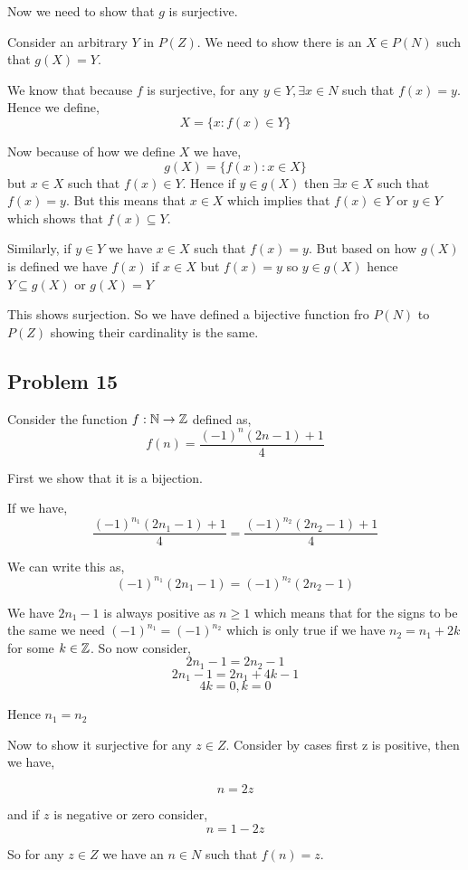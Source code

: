 \documentclass[a4paper]{report}
\begin{document}
Now we need to show that $g$ is surjective.

Consider an arbitrary $Y$ in $P(Z)$. We need to show there is an $X \in P(N)$ such that $g(X) = Y$.

We know that because $f$ is surjective, for any $y \in Y, \exists x \in N$  such that $f(x) = y$. Hence we define, 
$$ X = \{x: f(x) \in Y\} $$ 

Now because of how we define $X$ we have, 
$$ g(X) = \{f(x): x \in X\} $$  but $x \in X$ such that $f(x) \in Y$. Hence  if $y \in g(X)$ then  $\exists x \in X$ such that $f(x) = y$. But this means that $x \in X$ which implies that $f(x) \in Y$ or $y \in Y$ which shows that  $f(x) \subseteq Y$.

Similarly, if  $y \in Y$ we have $x \in X$ such that $f(x) = y$. But based on how  $g(X)$ is defined we have $f(x)$ if $x \in X$ but $f(x) = y$ so $y \in g(X)$ hence $Y \subseteq g(X)$ or $ g(X) = Y$

This shows surjection. So we have defined a bijective function fro $P(N)$ to  $P(Z)$ showing their cardinality is the same.



\subsection*{Problem 15}
Consider the function $f: \mathbb{N} \rightarrow \mathbb{Z}$ defined as, 
$$ f(n) = \frac{(-1)^{n}(2n - 1) + 1}{4} $$ 

First we show that it is a bijection.

If we have, 
$$ \frac{(-1)^{n_1}(2n_1 - 1) + 1}{4} = \frac{(-1)^{n_2}(2n_2 - 1) + 1}{4} $$ 

We can write this as, 
$$ (-1)^{n_1}(2n_1 - 1) = (-1)^{n_2}(2n_2 - 1) $$ 

We have $2n_1 -1 $ is always positive as $n \ge 1$ which means that for the signs to be the same we need  $(-1)^{n_1} = (-1)^{n_2}$ which is only true if we have $n_2 = n_1 + 2k$ for some $k \in \mathbb{Z}$.  So now consider,  
$$ 2n_1 - 1 = 2n_2 - 1 $$ 
$$ 2n_1 - 1 = 2n_1 + 4k - 1 $$ 
$$ 4k = 0, k = 0 $$ 

Hence $n_1 = n_2$

Now to show it surjective for any $z \in Z$. Consider by cases first z is positive, then we have, 

$$ n = 2z $$ 

and if $z$ is negative or zero consider, 
$$ n =  1 - 2z $$ 

So for any $z \in Z$ we have an $n \in N$ such that $f(n) = z$. 
\end{document}
